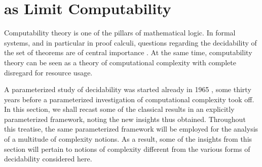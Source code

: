 \section{as Limit Computability}
\label{sec:computability}%

Computability theory \parencite{rogers1967theory} is one of the pillars of mathematical logic.
In formal systems, and in particular in proof calculi, questions regarding the decidability of the set of theorems are of central importance \parencite{kleene1967mathematical}.
At the same time, computability theory can be seen as a theory of computational complexity with complete disregard for resource usage.

A parameterized study of decidability was started already in 1965 \parencite{putnam1965trial,gold1965limiting}, some thirty years before a parameterized investigation of computational complexity took off.
In this section, we shall recast some of the classical results in an explicitly parameterized framework, noting the new insights thus obtained.
Throughout this treatise, the same parameterized framework will be employed for the analysis of a multitude of complexity notions.
As a result, some of the insights from this section will pertain to notions of complexity different from the various forms of decidability considered here.


